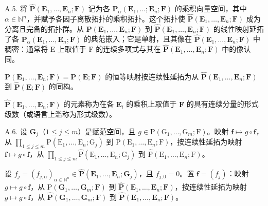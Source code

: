A.5. 将 \(\hat{\mathbf{P}}(\mathbf{E}_{1},\ldots,\mathbf{E}_{n};\mathbf{F})\) 记为各 \(\mathbf{P}_{\alpha}(\mathbf{E}_{1},\ldots;\mathbf{E}_{n};\mathbf{F})\) 的乘积向量空间，其中 \(\alpha\in\mathbb{N}^{n}\)，并赋予各因子离散拓扑的乘积拓扑。这个拓扑使 \(\hat{\mathbf{P}}(\mathbf{E}_{1},\ldots,\mathbf{E}_{n};\mathbf{F})\) 成为分离且完备的拓扑群。从 \(\mathbf{P}(\mathbf{E}_{1},\ldots,\mathbf{E}_{n};\mathbf{F})\) 到 \(\hat{\mathbf{P}}(\mathbf{E}_{1},\ldots,\mathbf{E}_{n};\mathbf{F})\) 的线性映射延拓了各 \(\mathbf{P}_{\alpha}(\mathbf{E}_{1},\ldots,\mathbf{E}_{n};\mathbf{F})\) 的典范嵌入；它是单射，且其像在 \(\hat{\mathbf{P}}(\mathbf{E}_{1},\ldots,\mathbf{E}_{n};\mathbf{F})\) 中稠密：通常将 E 上取值于 F 的连续多项式与其在 \(\hat{\mathbf{P}}(\mathbf{E}_{1},\ldots,\mathbf{E}_{n};\mathbf{F})\) 中的像认同。

\(\mathbf{P}(\mathbf{E}_{1},\ldots,\mathbf{E}_{n};\mathbf{F})=\mathbf{P}(\mathbf{E};\mathbf{F})\) 的恒等映射按连续性延拓为从 \(\hat{\mathbf{P}}(\mathbf{E}_{1},\ldots,\mathbf{E}_{n};\mathbf{F})\) 到 \(\hat{\mathbf{P}}(\mathbf{E};\mathbf{F})\) 的同构。

\(\hat{\mathbf{P}}(\mathbf{E}_{1},\ldots,\mathbf{E}_{n};\mathbf{F})\) 的元素称为在各 \(\mathbf{E}_{i}\) 的乘积上取值于 \(\mathbf{F}\) 的具有连续分量的形式级数（或语言上滥称为形式级数）。

A.6. 设 \(\mathbf{G}_j\)（\(1 \leqslant j \leqslant m\)）是赋范空间，且 \(g \in \mathrm{P}(\mathrm{G}_1, \ldots, \mathrm{G}_m; \mathrm{F})\)。映射 \(\mathbf{f} \mapsto g \circ \mathbf{f}\)，从 \(\prod_{1 \leqslant j \leqslant m} \mathrm{P}(\mathrm{E}_1, \ldots, \mathrm{E}_n; \mathrm{G}_j)\) 到 \(\mathrm{P}(\mathrm{E}_1, \ldots, \mathrm{E}_n; \mathrm{F})\)，按连续性延拓为映射 \(\mathbf{f} \mapsto g \circ \mathbf{f}\)，从 \(\prod_{1 \leqslant j \leqslant m} \hat{\mathrm{P}}(\mathrm{E}_1, \ldots, \mathrm{E}_n; \mathrm{G}_j)\) 到 \(\hat{\mathrm{P}}(\mathrm{E}_1, \ldots, \mathrm{E}_n; \mathrm{F})\)。

设 \(f_j = (f_{j,\alpha})_{\alpha \in \mathbb{N}^n} \in \hat{\mathbf{P}}(\mathbf{E}_1, \ldots, \mathbf{E}_n; \mathbf{G}_j)\)，且 \(f_{j,0} = 0\)。置 \(\mathbf{f} = (f_j)\)：映射 \(g \mapsto g \circ \mathbf{f}\)，从 \(\mathrm{P}(\mathbf{G}_1, \ldots, \mathbf{G}_m; \mathbf{F})\) 到 \(\hat{\mathbf{P}}(\mathbf{E}_1, \ldots, \mathbf{E}_n; \mathbf{F})\)，按连续性延拓为映射 \(g \mapsto g \circ \mathbf{f}\)，从 \(\hat{\mathbf{P}}(\mathbf{G}_1, \ldots, \mathbf{G}_m; \mathbf{F})\) 到 \(\hat{\mathbf{P}}(\mathbf{E}_1, \ldots, \mathbf{E}_n; \mathbf{F})\)。

